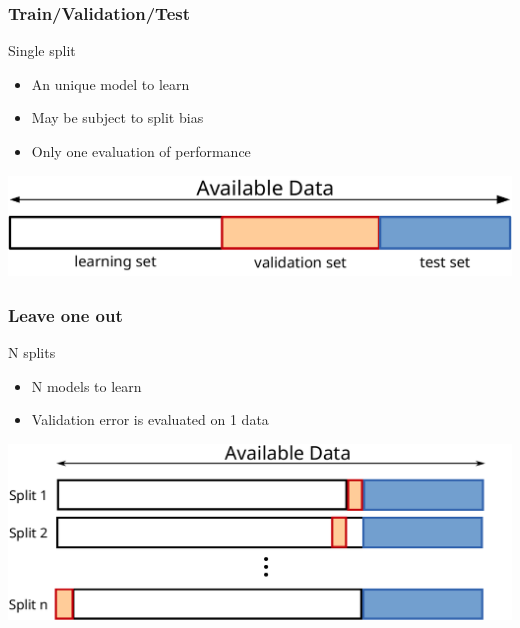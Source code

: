 \documentclass[11pt, pdf, compress, handout]{beamer}
\begin{document}
\begin{frame}
  \frametitle{Train/Validation/Test}
  \begin{block}{Single split}
    \begin{itemize}
    \item[\itemplus] An unique model to learn
    \item[\itemmoins] May be subject to split bias
    \item[\itemmoins] Only one evaluation of performance
    \end{itemize}
    \begin{center}
      \includegraphics[width=\textwidth]{datasplit-App-Val-Test}
    \end{center}
  \end{block}
\end{frame}

\begin{frame}
  \frametitle{Leave one out}

    \begin{block}{N splits}
      \begin{itemize}
      \item[\itemmoins] N models to learn
      \item[\itemmoins] Validation error is evaluated on 1 data
      \end{itemize}
      \begin{center}
        \includegraphics[width=\textwidth]{datasplit-leaveoneout}
    \end{center}
  \end{block}
\end{frame}
\end{document}
